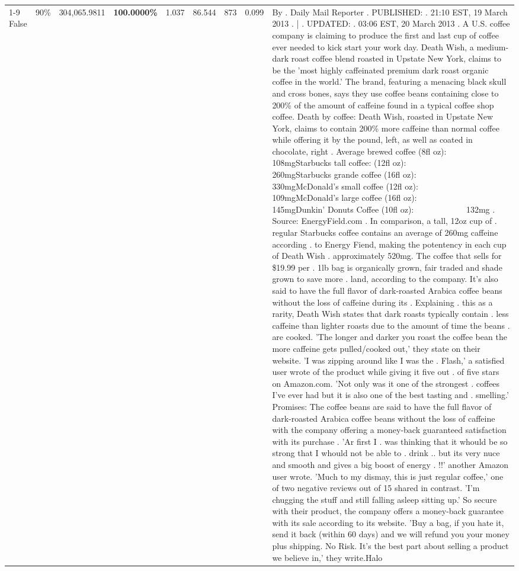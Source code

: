 \begin{table}[H]
{\begin{tabular}{lllrlllll}
\cline{1-9} \cline{2-9}
False & 90\% & 304,065.9811 & \bfseries \color{red} 100.0000\% & 1.037 & 86.544 & 873 & 0.099 & By . Daily Mail Reporter . PUBLISHED: . 21:10 EST, 19 March 2013 . | . UPDATED: . 03:06 EST, 20 March 2013 . A U.S. coffee company is claiming to produce the first and last cup of coffee ever needed to kick start your work day. Death Wish, a medium-dark roast coffee blend roasted in Upstate New York, claims to be the 'most highly caffeinated premium dark roast organic coffee in the world.' The brand, featuring a menacing black skull and cross bones, says they use coffee beans containing close to 200\% of the amount of caffeine found in a typical coffee shop coffee. Death by coffee: Death Wish, roasted in Upstate New York, claims to contain 200\% more caffeine than normal coffee while offering it by the pound, left, as well as coated in chocolate, right . Average brewed coffee (8fl oz):              108mgStarbucks tall coffee: (12fl oz):                260mgStarbucks grande coffee (16fl oz):         330mgMcDonald's small coffee (12fl oz):           109mgMcDonald's large coffee (16fl oz):           145mgDunkin' Donuts Coffee (10fl oz):             132mg . Source: EnergyField.com . In comparison, a tall, 12oz cup of . regular Starbucks coffee contains an average of 260mg caffeine according . to Energy Fiend, making the potentency in each cup of Death Wish . approximately 520mg. The coffee that sells for \$19.99 per . 1lb bag is organically grown, fair traded and shade grown to save more . land, according to the company. It's also said to have the full flavor of dark-roasted Arabica coffee beans without the loss of caffeine during its . Explaining . this as a rarity, Death Wish states that dark roasts typically contain . less caffeine than lighter roasts due to the amount of time the beans . are cooked. 'The longer and darker you roast the coffee bean the more caffeine gets pulled/cooked out,' they state on their website. 'I was zipping around like I was the . Flash,' a satisfied user wrote of the product while giving it five out . of five stars on Amazon.com. 'Not only was it one of the strongest . coffees I've ever had but it is also one of the best tasting and . smelling.’ Promises: The coffee beans are said to have the full flavor of dark-roasted Arabica coffee beans without the loss of caffeine with the company offering a money-back guaranteed satisfaction with its purchase . 'Ar first I . was thinking that it whould be so strong that I whould not be able to . drink .. but its very nuce and smooth and gives a big boost of energy . !!' another Amazon user wrote. 'Much to my dismay, this is just regular coffee,' one of two negative reviews out of 15 shared in contrast. 'I'm chugging the stuff and still falling asleep sitting up.' So secure with their product, the company offers a money-back guarantee with its sale according to its website. 'Buy a bag, if you hate it, send it back (within 60 days) and we will refund you your money plus shipping. No Risk. It’s the best part about selling a product we believe in,' they write.Halo \\

\end{tabular}}
\end{table}
